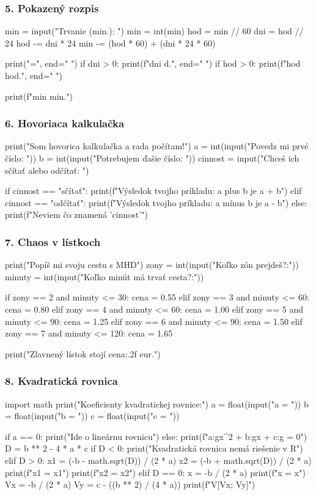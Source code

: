 \subsubsection*{5. Pokazený rozpis}
\begin{solution}
min = input("Trvanie (min.): ")
min = int(min)
hod = min // 60
dni = hod // 24
hod -= dni * 24
min -= (hod * 60) + (dni * 24 * 60)

print("=", end=" ")
if dni > 0:
    print(f"{dni} d.", end=" ")
if hod > 0:
    print(f"{hod} hod.", end=" ")

print(f"{min} min.")
\end{solution}

\subsubsection*{6. Hovoriaca kalkulačka}
\begin{solution}
print("Som hovorica kalkulačka a rada počítam!")
a = int(input("Povedz mi prvé číslo: "))
b = int(input("Potrebujem ďašie číslo: "))
cinnost = input("Chceš ich sčítať alebo odčítať: ")

if cinnost == "sčítať":
    print(f"Výsledok tvojho príkladu: {a} plus {b} je {a + b}")
elif cinnost == "odčítať":
    print(f"Výsledok tvojho príkladu: {a} mínus {b} je {a - b}")
else:
    print(f"Neviem čo znamená '{cinnost}'")
\end{solution}

\subsubsection*{7. Chaos v lístkoch}
\begin{solution}
print("Popíš mi svoju cestu s MHD")
zony = int(input("Koľko zón prejdeš?:"))
minuty = int(input("Koľko minút má trvať cesta?:"))

if zony == 2 and minuty <= 30:
	cena = 0.55
elif zony == 3 and minuty <= 60:
	cena = 0.80
elif zony == 4 and minuty <= 60:
	cena = 1.00
elif zony == 5 and minuty <= 90:
	cena = 1.25
elif zony == 6 and minuty <= 90:
	cena = 1.50
elif zony == 7 and minuty <= 120:
	cena = 1.65

print("Zlavnený lístok stojí {cena:.2f} eur.")
\end{solution} 

\subsubsection*{8. Kvadratická rovnica}
\begin{solution}
import math
print("Koeficienty kvadratickej rovnice:")
a = float(input("a = "))
b = float(input("b = "))
c = float(input("c = "))

if a == 0:
	print("Ide o lineárnu rovnicu")
else:
	print(f"{a:g}x^2 + {b:g}x + {c:g} = 0")
	D = b ** 2 - 4 * a * c
	if D < 0:
		print("Kvadratická rovnica nemá riešenie v R")
	elif D > 0:
		x1 = (-b - math.sqrt(D)) / (2 * a)
		x2 = (-b + math.sqrt(D)) / (2 * a)
		print(f"x1 = {x1}")
		print(f"x2 = {x2}")
	elif D == 0:
		x = -b / (2 * a)
		print(f"x = {x}")
		Vx = -b / (2 * a)
		Vy = c - ((b ** 2) / (4 * a))
		print(f"V[{Vx}; {Vy}]")
\end{solution}

